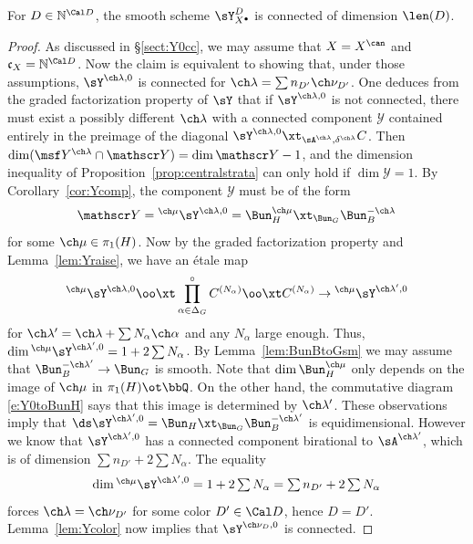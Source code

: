 \begin{lem}
\notready \label{lem:oYconnected}
For $D \in \mathbb N^{\Cal D}$,
the smooth scheme $\sY^{D}_{X^\bullet}$ is connected of dimension $\len(D)$.
\end{lem}
\begin{proof}
As discussed in \S\ref{sect:Y0cc}, we may assume that $X=X^\can$ and
$\mathfrak c_X = \mathbb N^{\Cal D}$.
Now the claim is equivalent to showing that, under those assumptions,
$\sY^{\ch\lambda,0}$ is connected for $\ch\lambda = \sum n_{D'} \ch\nu_{D'}$.
One deduces from the graded factorization property of $\sY$ that
if $\sY^{\ch\lambda,0}$ is not connected, there must exist a possibly different $\ch\lambda$
with a connected component $\mathscr Y$ contained entirely in the preimage of the diagonal
$\sY^{\ch\lambda,0} \xt_{\sA^{\ch\lambda}, \delta^{\ch\lambda}} C$.
Then $\dim (\msf Y^{\ch\lambda} \cap \mathscr Y) = \dim \mathscr Y - 1$,
and the dimension inequality of Proposition~\ref{prop:centralstrata} can only hold if
$\dim \mathscr Y = 1$.
By Corollary~\ref{cor:Ycomp}, the component $\mathscr Y$ must be of the form
\[ \mathscr Y = {^{\ch\mu}\sY^{\ch\lambda,0}} =
\Bun_H^{\ch\mu} \xt_{\Bun_G} \Bun_B^{-\ch\lambda} \]
for some $\ch\mu\in \pi_1(H)$.
Now by the graded factorization property and Lemma~\ref{lem:Yraise},
we have an \'etale map
\[ ^{\ch\mu}\sY^{\ch\lambda,0} \oo\xt
\prod^\circ_{\alpha\in\Delta_G} C^{(N_{\alpha})} \oo\xt C^{(N_{\alpha})} \to
{^{\ch\mu}}\sY^{\ch\lambda',0} \]
for $\ch\lambda' = \ch\lambda + \sum N_\alpha\ch\alpha$ and any $N_\alpha$ large enough.
Thus, $\dim {^{\ch\mu}}\sY^{\ch\lambda',0} = 1+2\sum N_\alpha$.
By Lemma~\ref{lem:BunBtoGsm} we may assume that
$\Bun_B^{-\ch\lambda'} \to \Bun_G$ is smooth.
Note that $\dim \Bun_H^{\ch\mu}$ only depends on the image of $\ch\mu$ in $\pi_1(H)\ot \bbQ$.
On the other hand, the commutative diagram \eqref{e:Y0toBunH}
says that this image is determined by $\ch\lambda'$.
These observations imply that $\ds \sY^{\ch\lambda',0}
= \Bun_H \xt_{\Bun_G} \Bun_B^{-\ch\lambda'}$ is equidimensional.
However we know that $\sY^{\ch\lambda',0}$ has a connected component
birational to $\sA^{\ch\lambda'}$, which is of dimension $\sum n_{D'} + 2\sum N_\alpha$.
The equality
\[ \textstyle \dim {^{\ch\mu}}\sY^{\ch\lambda',0} = 1+2\sum N_\alpha = \sum n_{D'} + 2\sum N_\alpha \]
forces $\ch\lambda = \ch\nu_{D'}$ for some color $D'\in \Cal D$, hence $D=D'$.
Lemma~\ref{lem:Ycolor} now implies that $\sY^{\ch\nu_D,0}$ is connected.
\end{proof}

